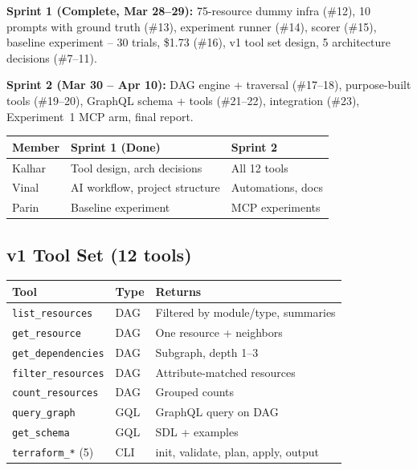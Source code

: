 \documentclass[10pt,twocolumn]{article}
\begin{document}
\textbf{Sprint 1 (Complete, Mar 28--29):} 75-resource dummy infra (\#12), 10 prompts with ground truth (\#13), experiment runner (\#14), scorer (\#15), baseline experiment -- 30 trials, \$1.73 (\#16), v1 tool set design, 5 architecture decisions (\#7--11).

\textbf{Sprint 2 (Mar 30 -- Apr 10):} DAG engine + traversal (\#17--18), purpose-built tools (\#19--20), GraphQL schema + tools (\#21--22), integration (\#23), Experiment~1 MCP arm, final report.

\begin{table}[h]
\centering\small
\begin{tabularx}{\columnwidth}{lXl}
\toprule
\textbf{Member} & \textbf{Sprint 1 (Done)} & \textbf{Sprint 2} \\
\midrule
Kalhar & Tool design, arch decisions & All 12 tools \\
Vinal & AI workflow, project structure & Automations, docs \\
Parin & Baseline experiment & MCP experiments \\
\bottomrule
\end{tabularx}
\end{table}

\subsection{v1 Tool Set (12 tools)}

\begin{table}[h]
\centering\small
\begin{tabularx}{\columnwidth}{llX}
\toprule
\textbf{Tool} & \textbf{Type} & \textbf{Returns} \\
\midrule
\texttt{list\_resources} & DAG & Filtered by module/type, summaries \\
\texttt{get\_resource} & DAG & One resource + neighbors \\
\texttt{get\_dependencies} & DAG & Subgraph, depth 1--3 \\
\texttt{filter\_resources} & DAG & Attribute-matched resources \\
\texttt{count\_resources} & DAG & Grouped counts \\
\texttt{query\_graph} & GQL & GraphQL query on DAG \\
\texttt{get\_schema} & GQL & SDL + examples \\
\texttt{terraform\_*} (5) & CLI & init, validate, plan, apply, output \\
\bottomrule
\end{tabularx}
\end{table}
\end{document}
